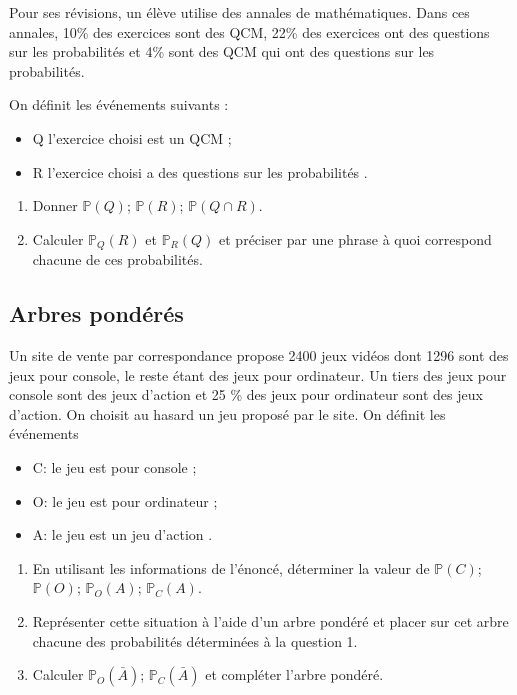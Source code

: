 \documentclass[french]{book}
\begin{document}
\begin{exocor}
Pour ses révisions, un élève utilise des annales de mathématiques. Dans ces annales, 10\% des exercices sont des QCM, 22\% des exercices ont des questions sur les probabilités et 4\% sont des QCM qui ont des questions sur les
probabilités. 

On définit les événements suivants :

\begin{itemize}
\item Q \og  l’exercice choisi est un QCM\fg{} ;
\item R \og  l’exercice choisi a des questions sur les probabilités \fg{}.
\end{itemize}

\begin{enumerate}
\item Donner $\mathbb{P}(Q)$; $\mathbb{P}(R)$; $\mathbb{P}(Q\cap R)$.
\item Calculer $\mathbb{P}_Q(R)$ et $\mathbb{P}_R(Q)$ et préciser par une phrase à quoi correspond chacune de ces probabilités.
\end{enumerate}
\end{exocor}

\vfill
\subsection{Arbres pondérés}
\begin{exocor}
Un site de vente par correspondance propose 2400 jeux
vidéos dont 1296 sont des jeux pour console, le reste étant
des jeux pour ordinateur. Un tiers des jeux pour console sont des jeux d’action et 25 \% des jeux pour ordinateur sont des jeux d’action. On
choisit au hasard un jeu proposé par le site. On définit les
événements
\begin{itemize}
\item C: \og le jeu est pour console \fg{}; 
\item O: \og  le jeu est pour ordinateur \fg{}; 
\item A: \og le jeu est un jeu d’action \fg{}. 
\end{itemize}

\begin{enumerate}
\item En utilisant les informations de l’énoncé, déterminer la
valeur de $\mathbb{P}(C)$; $\mathbb{P}(O)$; $\mathbb{P}_O(A)$; $\mathbb{P}_C(A)$.
\item Représenter cette situation à l’aide d’un arbre pondéré et
placer sur cet arbre chacune des probabilités déterminées à la question 1.
\item Calculer $\mathbb{P}_O(\bar{A})$; $\mathbb{P}_C(\bar{A})$ et compléter l’arbre pondéré.
\end{enumerate}
\end{exocor}
\end{document}
